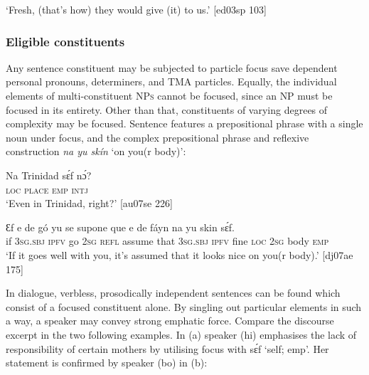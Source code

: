 \glt ‘Fresh, (that’s how) they would give (it) to us.’ [ed03sp 103] 
\z

\subsubsection{Eligible constituents}

Any sentence constituent may be subjected to particle focus save dependent personal pronouns, determiners, and \textsc{TMA} particles. Equally, the individual elements of multi-constituent \textsc{NPs} cannot be focused, since an \textsc{NP} must be focused in its entirety. Other than that, constituents of varying degrees of complexity may be focused. Sentence  features a prepositional phrase with a single noun under focus, and  the complex prepositional phrase and reflexive construction \textit{na yu skín} ‘on you(r body)’:


\ea%
    \label{ex:key:673}
    \gll Na  Trinidad  sɛ́f  nɔ́?\\
\textsc{loc}  \textsc{place}    \textsc{emp}  \textsc{intj}\\

\glt ‘Even in Trinidad, right?’ [au07se 226]
\z


\ea%
    \label{ex:key:674}
    \gll Ɛf  e    de  gó  yu  se  supone  que  e  de  fáyn
na  yu  skin    sɛ́f.\\
if  \textsc{3sg.sbj}  \textsc{ipfv}  go  \textsc{2sg}  \textsc{refl}  assume  that  \textsc{3sg.sbj}  \textsc{ipfv}  fine
\textsc{loc}  \textsc{2sg}  body  \textsc{emp}\\

\glt ‘If it goes well with you, it’s assumed that it looks nice on you(r body).’ [dj07ae 175]
\z

In dialogue, verbless, prosodically independent sentences can be found which consist of a focused constituent alone. By singling out particular elements in such a way, a speaker may convey strong emphatic force. Compare the discourse excerpt in the two following examples. In (a) speaker (hi) emphasises the lack of responsibility of certain mothers by utilising focus with sɛ́f ‘self; emp’. Her statement is confirmed by speaker (bo) in (b):


\ea%
    \label{ex:key:675}
\z\z

